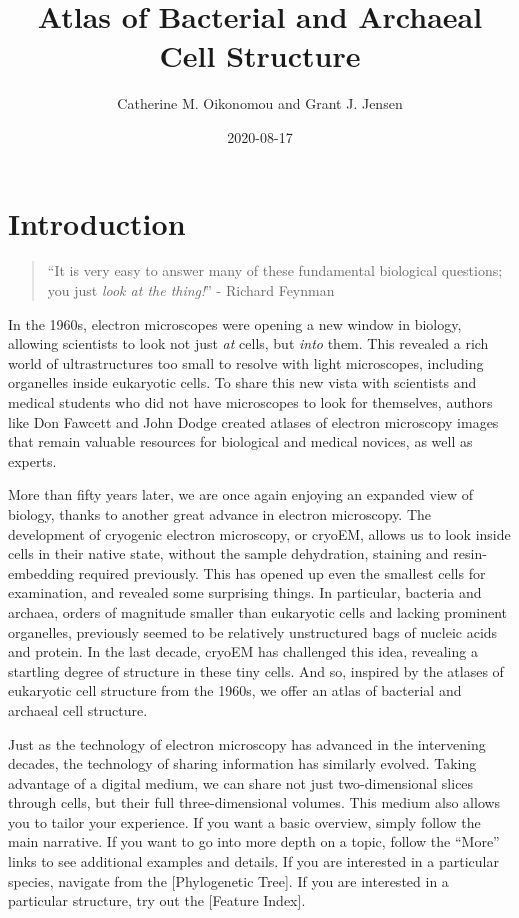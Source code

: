 \documentclass[]{tufte-book}
\title{Atlas of Bacterial and Archaeal Cell Structure}
\author{Catherine M. Oikonomou and Grant J. Jensen}
\date{2020-08-17}
\begin{document}
\maketitle



{
\setcounter{tocdepth}{1}
\tableofcontents
}

\chapter*{Introduction}\label{introduction}

\begin{quote}
``It is very easy to answer many of these fundamental biological
questions; you just \emph{look at the thing!}'' - Richard Feynman
\citep{feynman1960}
\end{quote}

In the 1960s, electron microscopes were opening a new window in biology,
allowing scientists to look not just \emph{at} cells, but \emph{into}
them. This revealed a rich world of ultrastructures too small to resolve
with light microscopes, including organelles inside eukaryotic cells. To
share this new vista with scientists and medical students who did not
have microscopes to look for themselves, authors like Don Fawcett
\citep{fawcett1966} and John Dodge \citep{dodge1968} created atlases of
electron microscopy images that remain valuable resources for biological
and medical novices, as well as experts.

More than fifty years later, we are once again enjoying an expanded view
of biology, thanks to another great advance in electron microscopy. The
development of cryogenic electron microscopy, or cryoEM, allows us to
look inside cells in their native state, without the sample dehydration,
staining and resin-embedding required previously. This has opened up
even the smallest cells for examination, and revealed some surprising
things. In particular, bacteria and archaea, orders of magnitude smaller
than eukaryotic cells and lacking prominent organelles, previously
seemed to be relatively unstructured bags of nucleic acids and protein.
In the last decade, cryoEM has challenged this idea, revealing a
startling degree of structure in these tiny cells. And so, inspired by
the atlases of eukaryotic cell structure from the 1960s, we offer an
atlas of bacterial and archaeal cell structure.

Just as the technology of electron microscopy has advanced in the
intervening decades, the technology of sharing information has similarly
evolved. Taking advantage of a digital medium, we can share not just
two-dimensional slices through cells, but their full three-dimensional
volumes. This medium also allows you to tailor your experience. If you
want a basic overview, simply follow the main narrative. If you want to
go into more depth on a topic, follow the ``More'' links to see
additional examples and details. If you are interested in a particular
species, navigate from the {[}Phylogenetic Tree{]}. If you are
interested in a particular structure, try out the {[}Feature Index{]}.
\end{document}
